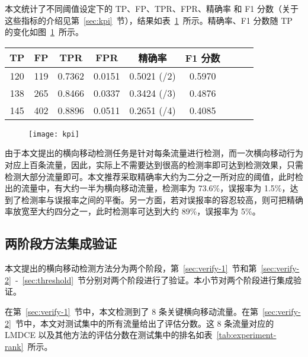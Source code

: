 {本文统计了不同阈值设定下的 TP、FP、TPR、FPR、精确率 和 F1 分数（关于这些指标的介绍见第~\ref{sec:kpi}~节），结果如表~\ref{tab:experiment-kpi}~所示。精确率、F1 分数随 TP 的变化如图~\ref{fig:experiment-kpi}~所示。

\begin{table}[t]
    \label{tab:experiment-kpi}
    \centering
    \footnotesize%
    \setlength{\tabcolsep}{4pt}%
    \renewcommand{\arraystretch}{1.2}%
    \begin{tabular}{ccccccccc}
        \hline
        TP & FP & TPR & FPR & 精确率 & F1 分数\\
        \hline
        120 & 119 & 0.7362 & 0.0151 & 0.5021 (\approx 1/2) & 0.5970\\
        138 & 265 & 0.8466 & 0.0337 & 0.3424 (\approx 1/3) & 0.4876\\
        145 & 402 & 0.8896 & 0.0511 & 0.2651 (\approx 1/4) & 0.4085\\
        \hline
    \end{tabular}
\end{table}

\begin{figure}[t]
    \centering
    \texttt{[image: kpi]}
    \label{fig:experiment-kpi}

\end{figure}

由于本文提出的横向移动检测任务是针对每条流量进行检测，而一次横向移动行为对应上百条流量，因此，实际上不需要达到很高的检测率即可达到检测效果，只需检测大部分流量即可。本文推荐采取精确率大约为二分之一所对应的阈值，此时检出的流量中，有大约一半为横向移动流量，检测率为 73.6\%，误报率为 1.5\%，达到了检测率与误报率之间的平衡。另一方面，若对误报率的容忍较高，则可把精确率放宽至大约四分之一，此时检测率可达到大约 89\%，误报率为 5\%。

\subsection{两阶段方法集成验证}

本文提出的横向移动检测方法分为两个阶段，第~\ref{sec:verify-1}~节和第~\ref{sec:verify-2}~-~\ref{sec:threshold}~节分别对两个阶段进行了验证。本小节对两个阶段进行集成验证。

在第~\ref{sec:verify-1}~节中，本文检测到了 8 条关键横向移动流量。在第~\ref{sec:verify-2}~节中，本文对测试集中的所有流量给出了评估分数。这 8 条流量对应的 LMDCE 以及其他方法的评估分数在测试集中的排名如表~\ref{tab:experiment-rank}~所示。

}
